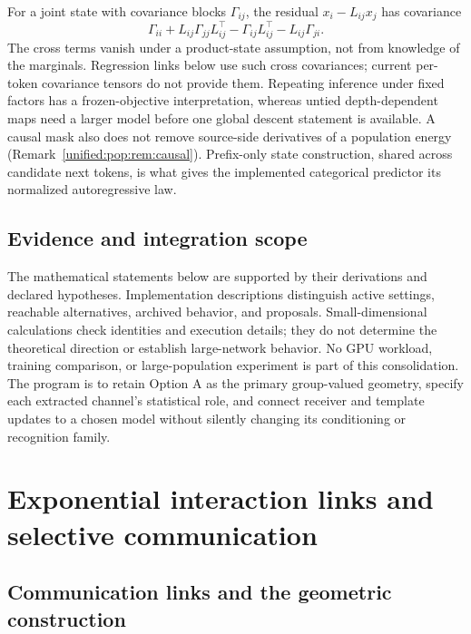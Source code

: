 \documentclass[11pt]{article}
\theoremstyle{definition}
\theoremstyle{remark}
\begin{document}
For a joint state with covariance blocks $\Gamma_{ij}$, the residual $x_i-L_{ij}x_j$ has covariance
\begin{equation}
\Gamma_{ii}+L_{ij}\Gamma_{jj}L_{ij}^\top-\Gamma_{ij}L_{ij}^\top-L_{ij}\Gamma_{ji}.
\label{unified:population_residual}
\end{equation}
The cross terms vanish under a product-state assumption, not from knowledge of the marginals. Regression links below use such cross covariances; current per-token covariance tensors do not provide them. Repeating inference under fixed factors has a frozen-objective interpretation, whereas untied depth-dependent maps need a larger model before one global descent statement is available. A causal mask also does not remove source-side derivatives of a population energy (Remark~\ref{unified:pop:rem:causal}). Prefix-only state construction, shared across candidate next tokens, is what gives the implemented categorical predictor its normalized autoregressive law.

\subsection{Evidence and integration scope}
\label{unified:evidence_scope}

The mathematical statements below are supported by their derivations and declared hypotheses. Implementation descriptions distinguish active settings, reachable alternatives, archived behavior, and proposals. Small-dimensional calculations check identities and execution details; they do not determine the theoretical direction or establish large-network behavior. No GPU workload, training comparison, or large-population experiment is part of this consolidation. The program is to retain Option A as the primary group-valued geometry, specify each extracted channel's statistical role, and connect receiver and template updates to a chosen model without silently changing its conditioning or recognition family.
\section{Exponential interaction links and selective communication}\label{unified:links}
\subsection{Communication links and the geometric construction}
\label{links:origin:sec:setting}
\end{document}
